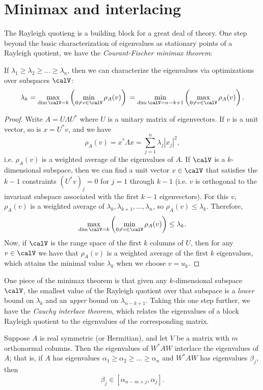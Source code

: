 \section{Minimax and interlacing}

The Rayleigh quotieng is a building block for a great deal of theory.
One step beyond the basic characterization of eigenvalues as stationary
points of a Rayleigh quotient, we have
the {\em Courant-Fischer minimax theorem}:
\begin{theorem}
  If $\lambda_1 \geq \lambda_2 \geq \ldots \geq \lambda_n$, then
  we can characterize the eigenvalues via optimizations over
  subspaces $\calV$:
  \[
    \lambda_k
      = \max_{\dim \calV = k} \left( \min_{0 \neq v \in \calV} \rho_A(v) \right) \\
      = \min_{\dim \calV = n-k+1} \left( \max_{0 \neq v \in \calV} \rho_A(v) \right).
  \]
\end{theorem}

\begin{proof}
  Write $A = U \Lambda U^*$ where $U$ is a unitary matrix of eigenvectors.
  If $v$ is a unit vector, so is $x = U^* v$, and we have
  \[
    \rho_A(v) = x^* \Lambda x = \sum_{j=1}^n \lambda_j |x_j|^2,
  \]
  i.e. $\rho_A(v)$ is a weighted average of the eigenvalues
  of $A$.  If $\calV$ is a $k$-dimensional subspace, then we can find
  a unit vector $v \in \calV$ that satisfies the $k-1$ constraints
  $(U^* v)_j = 0$ for $j = 1$ through $k-1$ (i.e. $v$ is orthogonal to
  the invariant subspace associated with the first $k-1$
  eigenvectors).  For this $v$, $\rho_A(v)$ is a weighted average of
  $\lambda_k, \lambda_{k+1}, \ldots, \lambda_n$, so $\rho_A(v) \leq
  \lambda_k$.  Therefore,
  \[
      \max_{\dim \calV = k} \left( \min_{0 \neq v \in \calV} \rho_A(v) \right)
      \leq \lambda_k.
  \]
  Now, if $\calV$ is the range space of the first $k$ columns of $U$,
  then for any $v \in \calV$ we have that $\rho_A(v)$ is a weighted
  average of the first $k$ eigenvalues, which attains the minimal value
  $\lambda_k$ when we choose $v = u_k$.
\end{proof}

One piece of the minimax theorem is that given any $k$-dimensional subspace
$\calV$, the smallest value of the Rayleigh quotient over that
subspace is a {\em lower} bound on $\lambda_k$ and an {\em upper} bound
on $\lambda_{n-k+1}$.  Taking this one step further, we have the {\em Cauchy
interlace theorem}, which relates the eigenvalues of a block Rayleigh quotient
to the eigenvalues of the corresponding matrix.
\begin{theorem}
  Suppose $A$ is real symmetric (or Hermitian), and let $V$ be a
  matrix with $m$ orthonormal columns.  Then the eigenvalues of
  $W^* A W$ interlace the eigenvalues of $A$; that is, if $A$
  has eigenvalues $\alpha_1 \geq \alpha_2 \geq \ldots \geq \alpha_n$
  and $W^* A W$ has eigenvalues $\beta_j$, then
  \[
    \beta_j \in [\alpha_{n-m+j}, \alpha_j].
  \]
\end{theorem}

